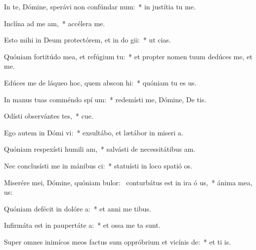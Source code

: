 \item In te, Dómine, sperávi non confúndar  num:~* in justítia tu  me.
\item Inclína ad me  am,~* accélera   me.
\item Esto mihi in Deum protectórem, et in do gii:~* ut   cias.
\item Quóniam fortitúdo mea, et refúgium   tu:~* et propter nomen tuum dedúces me, et  me.
\item Edúces me de láqueo hoc, quem abscon hi:~* quóniam tu es  us.
\item In manus tuas comméndo spí um:~* redemísti me, Dómine, De tis.
\item Odísti observántes tes,~* cue.
\item Ego autem in Dómi vi:~* exsultábo, et lætábor in miseri a.
\item Quóniam respexísti humili am,~* salvásti de necessitátibus  am.
\item Nec conclusísti me in mánibus ci:~* statuísti in loco spatió  os.
\item Miserére mei, Dómine, quóniam bulor:~\pscross{} conturbátus est in ira ó us,~* ánima mea,   us:
\item Quóniam defécit in dolóre  a:~* et anni me  tibus.
\item Infirmáta est in paupertáte  a:~* et ossa me ta sunt.
\item Super omnes inimícos meos factus sum oppróbrium et vicínis  de:~* et ti  is.
